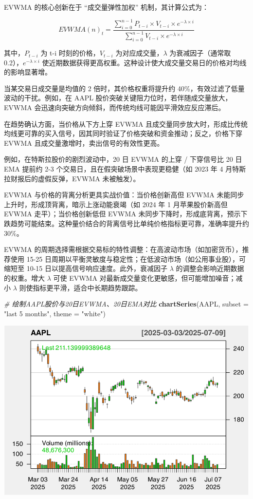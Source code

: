 \documentclass[]{ctexbook}
\newenvironment{Shaded}{\begin{snugshade}}{\end{snugshade}}
\newcommand{\AttributeTok}[1]{\textcolor[rgb]{0.13,0.29,0.53}{#1}}
\newcommand{\CommentTok}[1]{\textcolor[rgb]{0.56,0.35,0.01}{\textit{#1}}}
\newcommand{\FunctionTok}[1]{\textcolor[rgb]{0.13,0.29,0.53}{\textbf{#1}}}
\newcommand{\NormalTok}[1]{#1}
\newcommand{\StringTok}[1]{\textcolor[rgb]{0.31,0.60,0.02}{#1}}
\begin{document}
EVWMA 的核心创新在于 ``成交量弹性加权'' 机制，其计算公式为：

\[
EVWMA(n)_t = \frac{\sum_{i=0}^{n-1} P_{t-i} \times V_{t-i} \times e^{-\lambda \times i}}{\sum_{i=0}^{n-1} V_{t-i} \times e^{-\lambda \times i}}
\]

其中，\(P_{t-i}\) 为 t-i 时刻的价格，\(V_{t-i}\) 为对应成交量，\(\lambda\) 为衰减因子（通常取 0.2），\(e^{-\lambda \times i}\) 使近期数据获得更高权重。这种设计使大成交量交易日的价格对均线的影响显著增。

当某交易日成交量是均值的 2 倍时，其价格权重将提升约 40\%，有效过滤了低量波动的干扰。例如，在 AAPL 股价突破关键阻力位时，若伴随成交量放大，EVWMA 会迅速向突破方向倾斜，而传统均线可能因平滑效应反应滞后。

在趋势确认方面，当价格从下方上穿 EVWMA 且成交量同步放大时，形成比传统均线更可靠的买入信号，因其同时验证了价格突破和资金推动；反之，价格下穿 EVWMA 且成交量激增时，卖出信号的有效性更高。

例如，在特斯拉股价的剧烈波动中，20 日 EVWMA 的上穿 / 下穿信号比 20 日 EMA 提前约 2-3 个交易日，且在假突破场景中表现更稳健（如 2023 年 4 月特斯拉财报后的虚假反弹，EVWMA 未被触发）。

EVWMA 与价格的背离分析更具实战价值：当价格创新高但 EVWMA 未能同步上升时，形成顶背离，暗示上涨动能衰竭（如 2024 年 1 月苹果股价新高但 EVWMA 走平）；当价格创新低但 EVWMA 未同步下降时，形成底背离，预示下跌趋势可能结束。这种量价结合的背离信号比单纯价格指标更可靠，准确率提升约 30\%。

EVWMA 的周期选择需根据交易标的特性调整：在高波动市场（如加密货币），推荐使用 15-25 日周期以平衡灵敏度与稳定性；在低波动市场（如公用事业股），可缩短至 10-15 日以提高信号响应速度。此外，衰减因子 \(\lambda\) 的调整会影响近期数据的权重。增大 \(\lambda\) 可使 EVWMA 对最新成交量变化更敏感，但可能增加噪音；减小 \(\lambda\) 则使指标更平滑，适合中长期趋势跟踪。

\begin{Shaded}
\begin{Highlighting}[]
\CommentTok{\# 绘制AAPL股价与20日EVWMA、20日EMA对比}
\FunctionTok{chartSeries}\NormalTok{(AAPL, }\AttributeTok{subset =} \StringTok{"last 5 months"}\NormalTok{, }\AttributeTok{theme =} \StringTok{"white"}\NormalTok{)}
\end{Highlighting}
\end{Shaded}

\includegraphics[width=0.9\linewidth]{quantmod_files/figure-latex/evwma-1}
\end{document}

